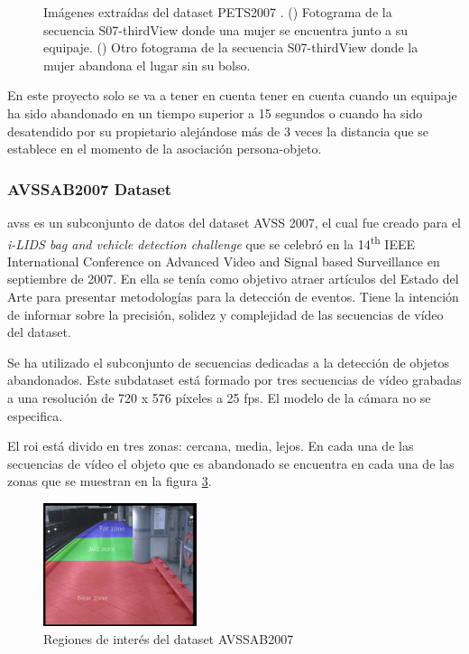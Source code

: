 \begin{figure}[ht]
\begin{subfigure}[b]{0.4\textwidth}
    \caption{}
    \label{fig:pets2007_4}
  \end{subfigure}
  \caption{Imágenes extraídas del dataset PETS2007 \cite{pets2007-dataset}.
    (\protect{}) Fotograma de la secuencia S07-thirdView donde una mujer se encuentra junto a su equipaje.
    (\protect{}) Otro fotograma de la secuencia S07-thirdView donde la mujer abandona el lugar sin su bolso.}
  \label{fig:pets2007_S07}
\end{figure}

En este proyecto solo se va a tener en cuenta tener en cuenta cuando un equipaje ha sido abandonado en un tiempo superior a 15 segundos o cuando ha sido desatendido por su propietario alejándose más de 3 veces la distancia que se establece en el momento de la asociación persona-objeto.

\subsubsection{AVSSAB2007 Dataset}

\gls{avss} \cite{AVSSAB2007-dataset} es un subconjunto de datos del dataset AVSS 2007, el cual fue creado para el \textit{i-LIDS bag and vehicle detection challenge} que se celebró en la 14\textsuperscript{th} IEEE International Conference on Advanced Video and Signal based Surveillance en septiembre de 2007. En ella se tenía como objetivo atraer artículos del Estado del Arte para presentar metodologías para la detección de eventos. Tiene la intención de informar sobre la precisión, solidez y complejidad de las secuencias de vídeo del dataset.

Se ha utilizado el subconjunto de secuencias dedicadas a la detección de objetos abandonados. Este subdataset está formado por tres secuencias de vídeo grabadas a una resolución de 720 x 576 píxeles a 25 \gls{fps}. El modelo de la cámara no se especifica.

El \gls{roi} está divido en tres zonas: cercana, media, lejos. En cada una de las secuencias de vídeo el objeto que es abandonado se encuentra en cada una de las zonas que se muestran en la figura \ref{fig:avssab2007-zones}.

\begin{figure}[ht]
\centering
\includegraphics[width=0.4\textwidth]{img/chapters/resultados/datasets/avssab2007-zones.png}
\caption{\label{fig:avssab2007-zones}Regiones de interés del dataset AVSSAB2007}
\end{figure}

